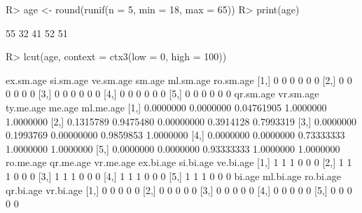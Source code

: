 \documentclass{article}\usepackage[]{graphicx}\usepackage[]{color}
\begin{document}
\begin{Schunk}
% --begin: "lcut.numeric"
\begin{Sinput}
R> age <- round(runif(n = 5, min = 18, max = 65))
R> print(age)
\end{Sinput}
\begin{Soutput}
[1] 55 32 41 52 51
\end{Soutput}
\begin{Sinput}
R> lcut(age, context = ctx3(low = 0, high = 100))
\end{Sinput}
\begin{Soutput}
     ex.sm.age si.sm.age ve.sm.age sm.age ml.sm.age ro.sm.age
[1,]         0         0         0      0         0         0
[2,]         0         0         0      0         0         0
[3,]         0         0         0      0         0         0
[4,]         0         0         0      0         0         0
[5,]         0         0         0      0         0         0
     qr.sm.age vr.sm.age  ty.me.age    me.age ml.me.age
[1,] 0.0000000 0.0000000 0.04761905 1.0000000 1.0000000
[2,] 0.1315789 0.9475480 0.00000000 0.3914128 0.7993319
[3,] 0.0000000 0.1993769 0.00000000 0.9859853 1.0000000
[4,] 0.0000000 0.0000000 0.73333333 1.0000000 1.0000000
[5,] 0.0000000 0.0000000 0.93333333 1.0000000 1.0000000
     ro.me.age qr.me.age vr.me.age ex.bi.age si.bi.age ve.bi.age
[1,]         1         1         1         0         0         0
[2,]         1         1         1         0         0         0
[3,]         1         1         1         0         0         0
[4,]         1         1         1         0         0         0
[5,]         1         1         1         0         0         0
     bi.age ml.bi.age ro.bi.age qr.bi.age vr.bi.age
[1,]      0         0         0         0         0
[2,]      0         0         0         0         0
[3,]      0         0         0         0         0
[4,]      0         0         0         0         0
[5,]      0         0         0         0         0
\end{Soutput}
%
% --end: "lcut.numeric"
\end{Schunk}
\end{document}
